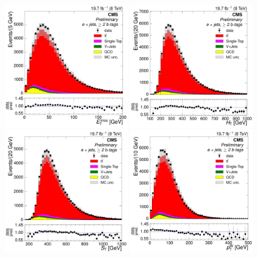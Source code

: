 \begin{figure}[hbtp]
    \centering
     \includegraphics[width=0.48\textwidth]{Chapters/04_Analysis/04b_XSections/images/control_plots/before_fit/8TeV/EPlusJets_patType1CorrectedPFMet_2orMoreBtags_with_ratio.pdf}\hfill
     \includegraphics[width=0.48\textwidth]{Chapters/04_Analysis/04b_XSections/images/control_plots/before_fit/8TeV/EPlusJets_HT_2orMoreBtags_with_ratio.pdf}\\
     \includegraphics[width=0.48\textwidth]{Chapters/04_Analysis/04b_XSections/images/control_plots/before_fit/8TeV/EPlusJets_patType1CorrectedPFMet_ST_2orMoreBtags_with_ratio.pdf}\hfill
     \includegraphics[width=0.48\textwidth]{Chapters/04_Analysis/04b_XSections/images/control_plots/before_fit/8TeV/EPlusJets_patType1CorrectedPFMet_WPT_2orMoreBtags_with_ratio.pdf}\\

\end{figure}
